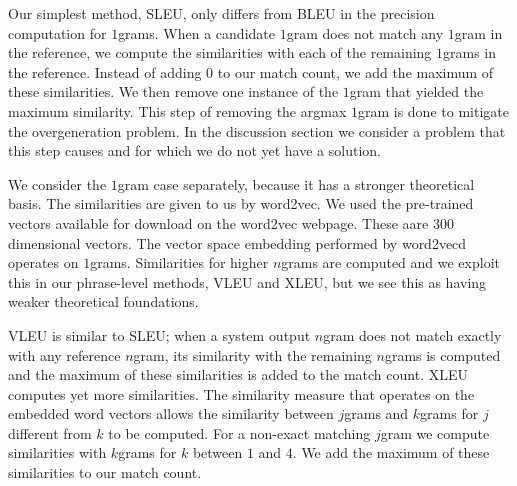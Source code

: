 
Our simplest method, SLEU,  only differs from BLEU in the precision computation for $1$grams. 
When a candidate $1$gram does not match any $1$gram in the reference, we compute the similarities with each of the remaining $1$grams in the reference. 
Instead of adding $0$ to our match count, we add the maximum of these similarities. 
We then remove one instance of the $1$gram that yielded the maximum similarity. 
This step of removing the argmax $1$gram is done to mitigate the overgeneration problem. 
In the discussion section we consider a problem that this step causes and for which we do not yet have a solution. 

We consider the $1$gram case separately, because it has a stronger theoretical basis. 
The similarities are given to us by word2vec. 
We used the pre-trained vectors available for download on the word2vec webpage. 
These aare $300$ dimensional vectors. 
The vector space embedding performed by word2vecd operates on $1$grams. 
Similarities for higher $n$grams are computed and we exploit this in our phrase-level methods, VLEU and XLEU, but we see this as having weaker theoretical foundations. 

VLEU is similar to SLEU; when a system output $n$gram does not match exactly with any reference $n$gram, its similarity with the remaining $n$grams is computed and the maximum of these similarities is added to the match count. 
XLEU computes yet more similarities. 
The similarity measure that operates on the embedded word vectors allows the similarity between $j$grams and $k$grams for $j$ different from $k$ to be computed. 
For a non-exact matching $j$gram we compute similarities with $k$grams for $k$ between $1$ and $4$. 
We add the maximum of these similarities to our match count. 

